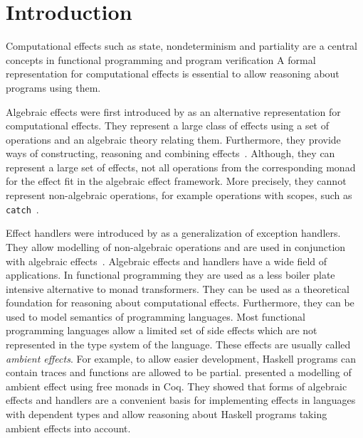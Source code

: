 \documentclass[10pt,a4paper,twoside,notitlepage]{report}
\begin{document}
\newpage

\tableofcontents

\chapter{Introduction}

Computational effects such as state, nondeterminism and partiality are a
central concepts in functional programming and program verification
A formal representation for computational effects is essential to allow
reasoning about programs using them.

Algebraic effects were first introduced by
\textcite{DBLP:journals/acs/PlotkinP03} as an alternative representation for
computational effects.
They represent a large class of effects using a set of operations and an
algebraic theory relating them.
Furthermore, they provide ways of constructing, reasoning and combining
effects~\cite{DBLP:journals/corr/PlotkinP13}.
Although, they can represent a large set of effects, not all operations from the
corresponding monad for the effect fit in the algebraic effect framework.
More precisely, they cannot represent non-algebraic operations, for example
operations with scopes, such as
\texttt{catch}~\cite{DBLP:journals/acs/PlotkinP03}.

Effect handlers were introduced by \textcite{DBLP:conf/esop/PlotkinP09} as a
generalization of exception handlers.
They allow modelling of non-algebraic operations and are used in conjunction
with algebraic effects~\cite{DBLP:journals/corr/PlotkinP13}.
Algebraic effects and handlers have a wide field of applications.
In functional programming they are used as a less boiler plate intensive
alternative to monad transformers.
They can be used as a theoretical foundation for reasoning about computational
effects.
Furthermore, they can be used to model semantics of programming languages.
Most functional programming languages allow a limited set of side
effects which are not represented in the type system of the language.
These effects are usually called \textit{ambient effects}.
For example, to allow easier development, Haskell programs can contain traces
and functions are allowed to be partial.
\textcite{DBLP:journals/programming/DylusCT19,DBLP:conf/haskell/ChristiansenDB19}
presented a modelling of ambient effect using free monads in Coq.
They showed that forms of algebraic effects and handlers are a convenient basis
for implementing effects in languages with dependent types and allow reasoning
about Haskell programs taking ambient effects into account.
\end{document}
